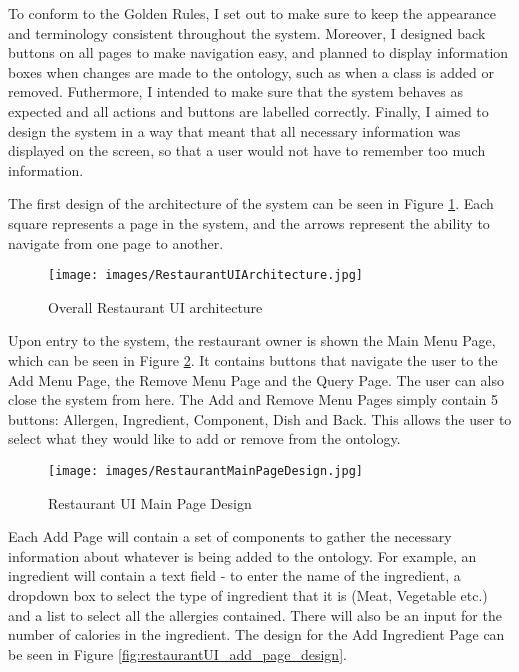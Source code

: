 To conform to the Golden Rules, I set out to make sure to keep the appearance and terminology consistent throughout the system. Moreover, I designed back buttons on all pages to make navigation easy, and planned to display information boxes when changes are made to the ontology, such as when a class is added or removed. Futhermore, I intended to make sure that the system behaves as expected and all actions and buttons are labelled correctly. Finally, I aimed to design the system in a way that meant that all necessary information was displayed on the screen, so that a user would not have to remember too much information.

The first design of the architecture of the system can be seen in Figure \ref{fig:restaurantUI_architecture}. Each square represents a page in the system, and the arrows represent the ability to navigate from one page to another.

\begin{figure}[h]
    \centering
    \captionsetup{justification=centering}
    \texttt{[image: images/RestaurantUIArchitecture.jpg]}
    \caption{Overall Restaurant UI architecture}
    \label{fig:restaurantUI_architecture}
\end{figure}

Upon entry to the system, the restaurant owner is shown the Main Menu Page, which can be seen in Figure \ref{fig:restaurantUI_main_page_design}. It contains buttons that navigate the user to the Add Menu Page, the Remove Menu Page and the Query Page. The user can also close the system from here. The Add and Remove Menu Pages simply contain 5 buttons: Allergen, Ingredient, Component, Dish and Back. This allows the user to select what they would like to add or remove from the ontology.

\begin{figure}[h]
    \centering
    \captionsetup{justification=centering}
    \texttt{[image: images/RestaurantMainPageDesign.jpg]}
    \caption{Restaurant UI Main Page Design}
    \label{fig:restaurantUI_main_page_design}
\end{figure}

Each Add Page will contain a set of components to gather the necessary information about whatever is being added to the ontology. For example, an ingredient will contain a text field - to enter the name of the ingredient, a dropdown box to select the type of ingredient that it is (Meat, Vegetable etc.) and a list to select all the allergies contained. There will also be an input for the number of calories in the ingredient. The design for the Add Ingredient Page can be seen in Figure \ref{fig:restaurantUI_add_page_design}.

